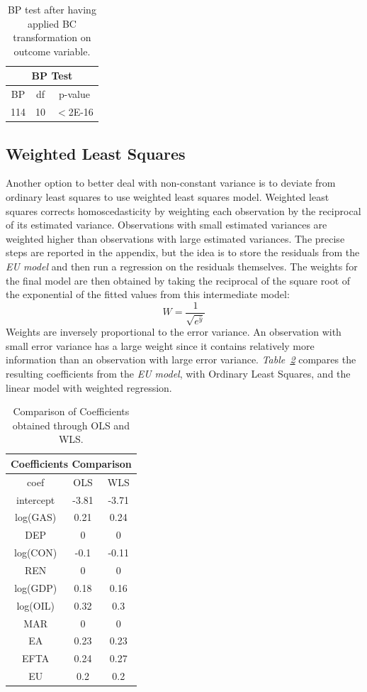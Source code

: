\documentclass[a4paper,12pt]{book}
\begin{document}
\begin{table}[tb]
\begin{center}
\begin{tabular}{|c|c|c|}
\hline
\multicolumn{3}{|c|}{BP Test}\\
\hline
BP&df&p-value\\
114&10&$<$2E-16\\
\hline
\end{tabular}
\caption{BP test after having applied BC transformation on outcome variable.}
\label{Tab:bpc}
\end{center}
\end{table}

\subsection{Weighted Least Squares}

Another option to better deal with non-constant variance is to deviate from ordinary least squares to use weighted least squares model. Weighted least squares corrects homoscedasticity by weighting each observation by the reciprocal of its estimated variance. Observations with small estimated variances are weighted higher than observations with large estimated variances. The precise steps are reported in the appendix, but the idea is to store the residuals from the \textit{EU model} and then run a regression on the residuals themselves. The weights for the final model are then obtained by taking the reciprocal of the square root of the exponential of the fitted values from this intermediate model: $$ W = \frac{1}{\sqrt{e^{\hat{y}}}}$$ Weights are inversely proportional to the error variance. An observation with small error variance has a large weight since it contains relatively more information than an observation with large error variance. \textit{Table~\ref{Tab:wls}} compares the resulting coefficients from the \textit{EU model}, with Ordinary Least Squares, and the linear model with weighted regression.

\begin{table}[tb]
\begin{center}
\begin{tabular}{|c|c|c|}
\hline
\multicolumn{3}{|c|}{Coefficients Comparison}\\
\hline
coef&OLS&WLS\\
\hline
intercept&-3.81&-3.71\\
log(GAS)&0.21&0.24\\
DEP&0&0\\
log(CON)&-0.1&-0.11\\
REN&0&0\\
log(GDP)&0.18&0.16\\
log(OIL)&0.32&0.3\\
MAR&0&0\\
EA&0.23&0.23\\
EFTA&0.24&0.27\\
EU&0.2&0.2\\
\hline
\end{tabular}
\caption{Comparison of Coefficients obtained through OLS and WLS.}
\label{Tab:wls}
\end{center}
\end{table}
\end{document}
